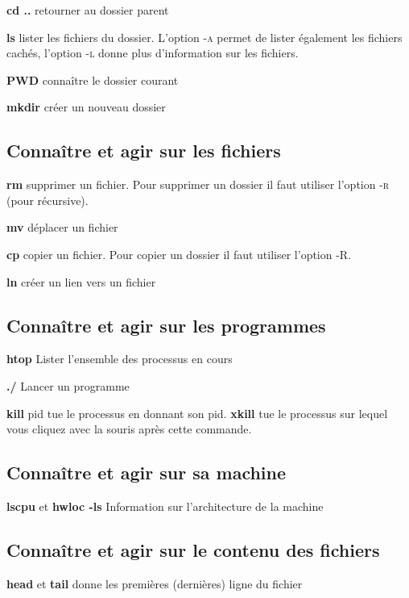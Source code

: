 \documentclass[11, a4paper, landscape]{article}
\begin{document}
\begin{multicols*}{3}
{  \textbf{cd ..} \quad retourner au dossier parent

  \textbf{ls} \quad lister les fichiers du dossier. L'option \textsc{-a} permet de lister également les fichiers cachés, l'option \textsc{-l} donne plus d'information sur les fichiers.

  \textbf{PWD} \quad connaître le dossier courant

  \textbf{mkdir} \quad créer un nouveau dossier

  \subsection{Connaître et agir sur les fichiers}

  \textbf{rm} \quad supprimer un fichier. Pour supprimer un dossier il faut utiliser l'option \textsc{-r} (pour récursive).

  \textbf{mv} \quad déplacer un fichier

  \textbf{cp} \quad copier un fichier. Pour copier un dossier il faut utiliser l'option \textsc{-R}.

  \textbf{ln} \quad créer un lien vers un fichier

  \subsection{Connaître et agir sur les programmes}

  \textbf{htop} \quad Lister l'ensemble des processus en cours

  \textbf{./} \quad Lancer un programme

  \textbf{kill} pid \quad tue le processus en donnant son pid. \textbf{xkill} tue le processus sur lequel vous cliquez avec la souris après cette commande.

  \subsection{Connaître et agir sur sa machine}

  \textbf{lscpu} et \textbf{hwloc -ls} \quad Information sur l'architecture de la machine

  \subsection{Connaître et agir sur le contenu des fichiers}

  \textbf{head} et \textbf{tail} \quad donne les premières (dernières) ligne du fichier

}
\end{multicols*}
\end{document}
